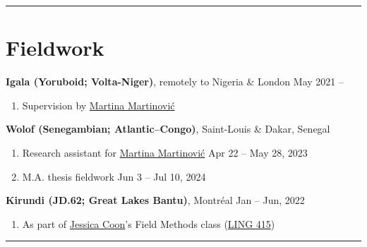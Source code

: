 \documentclass[margin,line]{resume}
\begin{document}
\begin{resume}
\begin{comment}
	\textbf{Junior Developer}, \href{https://gls-canada.com/en/dicom/corp/home}{GLS (\textit{fka} Dicom)}, Montréal \hfill Jan -- May 2019
	\begin{enumerate}[-, leftmargin=1em, topsep=4pt]
		\item[] Worked on \href{https://gls-canada.com/en/dicom/about-us/news/dicom-launches-smart4-shipping}{smart4 shipping platform} back-end
	\end{enumerate}
	\end{comment}

	\vspace{-0.9em}\rule{\textwidth}{0.4pt}



	\section{\mysidestyle Fieldwork}

	\textbf{Igala (Yoruboid; Volta-Niger)}, remotely to Nigeria \& London \hfill May 2021 --
	\begin{enumerate}[-, leftmargin=1em, topsep=4pt]
		\item[] Supervision by \href{https://inamartinovic.com/}{Martina Martinović}
	\end{enumerate}


	\textbf{Wolof (Senegambian; Atlantic–Congo)}, Saint-Louis \& Dakar, Senegal
	\begin{enumerate}[-, leftmargin=1em, topsep=4pt]
		\item[] Research assistant for \href{https://inamartinovic.com/}{Martina Martinović} \hfill Apr 22 -- May 28, 2023
		\item[] M.A. thesis fieldwork \hfill Jun 3 -- Jul 10, 2024
	\end{enumerate}

	\textbf{Kirundi (JD.62; Great Lakes Bantu)}, Montréal \hfill Jan -- Jun, 2022
	\begin{enumerate}[-, leftmargin=1em, topsep=4pt]
		\item[] As part of \href{https://jessica.lingspace.org/}{Jessica Coon}'s Field Methods class (\href{https://www.mcgill.ca/study/2021-2022/courses/ling-415}{LING 415})
	\end{enumerate}

	\vspace{-0.9em}\rule{\textwidth}{0.4pt}



\end{resume}
\end{document}
